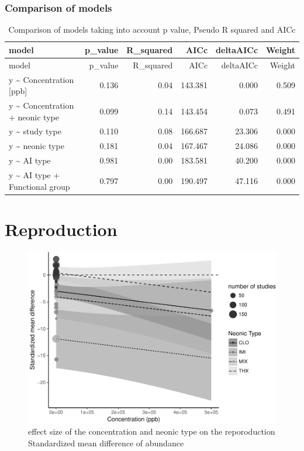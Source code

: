 \documentclass[]{elsarticle} %
\makeatletter
\def\maxwidth{\ifdim\Gin@nat@width>\linewidth\linewidth
\else\Gin@nat@width\fi}
\let\Oldincludegraphics\includegraphics
\renewcommand{\includegraphics}[1]{\Oldincludegraphics[width=\maxwidth]{#1}}
\makeatother
\begin{document}
\subsubsection{Comparison of models}\label{comparison-of-models-1}

\begin{longtable}[c]{@{}lrrrrr@{}}
\caption{Comparison of models taking into account p value, Pseudo R
squared and AICc}\tabularnewline
\toprule
model & p\_value & R\_squared & AICc & deltaAICc & Weight\tabularnewline
\midrule
\endfirsthead
\toprule
model & p\_value & R\_squared & AICc & deltaAICc & Weight\tabularnewline
\midrule
\endhead
y \textasciitilde{} Concentration {[}ppb{]} & 0.136 & 0.04 & 143.381 &
0.000 & 0.509\tabularnewline
y \textasciitilde{} Concentration + neonic type & 0.099 & 0.14 & 143.454
& 0.073 & 0.491\tabularnewline
y \textasciitilde{} study type & 0.110 & 0.08 & 166.687 & 23.306 &
0.000\tabularnewline
y \textasciitilde{} neonic type & 0.181 & 0.04 & 167.467 & 24.086 &
0.000\tabularnewline
y \textasciitilde{} AI type & 0.981 & 0.00 & 183.581 & 40.200 &
0.000\tabularnewline
y \textasciitilde{} AI type + Functional group & 0.797 & 0.00 & 190.497
& 47.116 & 0.000\tabularnewline
\bottomrule
\end{longtable}

\section{Reproduction}\label{reproduction}

\begin{figure}[htbp]
\centering
\includegraphics{MetanalysisNeonics_files/figure-latex/unnamed-chunk-27-1.pdf}
\caption{effect size of the concentration and neonic type on the
reporoduction Standardized mean difference of abundance}
\end{figure}
\end{document}
